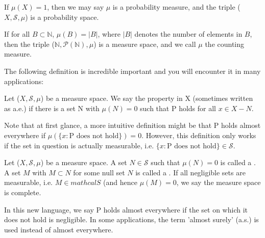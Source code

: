 \documentclass[11pt]{scrartcl}
\begin{document}
\begin{example}
If $\mu(X)=1$, then we may say $\mu$ is a probability measure, and the triple ($X,\mathcal{S},\mu$) is a probability space.
\end{example}

\begin{example}
If for all $B \subset \mathbb{N}$, $\mu(B) = |B|$, where $|B|$ denotes the number of elements in $B$, then the triple  ($\mathbb{N},\mathcal{P}(\mathbb{N}),\mu$) is a measure space, and we call $\mu$ the counting measure.
\end{example}{}

The following definition is incredible important and you will encounter it in many applications:

\begin{definition}
Let ($X,\mathcal{S},\mu$) be a measure space. We say the property  in X (sometimes written as a.e.) if there is a set N with $\mu(N) = 0 $ such that P holds for all $x \in X - N$.
\end{definition}

\begin{remark}\label{rem:ae}
Note that at first glance, a more intuitive definition might be that P holds almost everywhere if  $\mu(\{x: \text{P does not hold}\}) = 0$. However, this definition only works if the set in question is actually measurable, i.e. $\{x: \text{P does not hold}\} \in \mathcal S $.
\end{remark}

\begin{definition}
Let ($X,\mathcal{S},\mu$) be a measure space.
A set $N \in \mathcal S$ such that $\mu(N) = 0$ is called a .
A set $M$ with $M \subset N$ for some null set $N$ is called a .
If all negligible sets are measurable, i.e. $M \in mathcal S$ (and hence $\mu(M) = 0$, we say the measure space is complete.
\end{definition}

\begin{remark}\label{rem:aectd}
In this new language, we say P holds almost everywhere if the set on which it does not hold is negligible.
In some applications, the term 'almost surely' (a.s.) is used instead of almost everywhere.
\end{remark}

\end{document}
